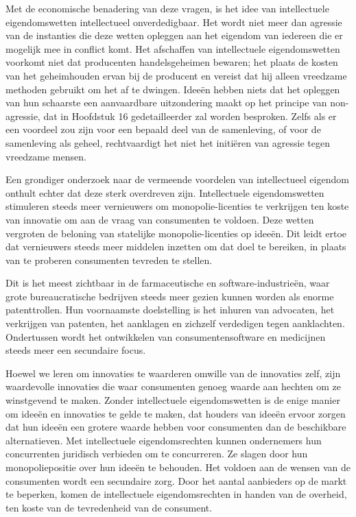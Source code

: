 Met de economische benadering van deze vragen, is het idee van intellectuele eigendomswetten intellectueel onverdedigbaar. Het wordt niet meer dan agressie van de instanties die deze wetten opleggen aan het eigendom van iedereen die er mogelijk mee in conflict komt. Het afschaffen van intellectuele eigendomswetten voorkomt niet dat producenten handelsgeheimen bewaren; het plaats de kosten van het geheimhouden ervan bij de producent en vereist dat hij alleen vreedzame methoden gebruikt om het af te dwingen. Ideeën hebben niets dat het opleggen van hun schaarste een aanvaardbare uitzondering maakt op het principe van non-agressie, dat in Hoofdstuk 16 gedetailleerder zal worden besproken. Zelfs als er een voordeel zou zijn voor een bepaald deel van de samenleving, of voor de samenleving als geheel, rechtvaardigt het niet het initiëren van agressie tegen vreedzame mensen.

Een grondiger onderzoek naar de vermeende voordelen van intellectueel eigendom onthult echter dat deze sterk overdreven zijn. Intellectuele eigendomswetten stimuleren steeds meer vernieuwers om monopolie-licenties te verkrijgen ten koste van innovatie om aan de vraag van consumenten te voldoen. Deze wetten vergroten de beloning van statelijke monopolie-licenties op ideeën. Dit leidt ertoe dat vernieuwers steeds meer middelen inzetten om dat doel te bereiken, in plaats van te proberen consumenten tevreden te stellen.

Dit is het meest zichtbaar in de farmaceutische en software-industrieën, waar grote bureaucratische bedrijven steeds meer gezien kunnen worden als enorme patenttrollen. Hun voornaamste doelstelling is het inhuren van advocaten, het verkrijgen van patenten, het aanklagen en zichzelf verdedigen tegen aanklachten. Ondertussen wordt het ontwikkelen van consumentensoftware en medicijnen steeds meer een secundaire focus.

Hoewel we leren om innovaties te waarderen omwille van de innovaties zelf, zijn waardevolle innovaties die waar consumenten genoeg waarde aan hechten om ze winstgevend te maken. Zonder intellectuele eigendomswetten is de enige manier om ideeën en innovaties te gelde te maken, dat houders van ideeën ervoor zorgen dat hun ideeën een grotere waarde hebben voor consumenten dan de beschikbare alternatieven.
 \autocite{88} Met intellectuele eigendomsrechten kunnen ondernemers hun concurrenten juridisch verbieden om te concurreren. Ze slagen door hun monopoliepositie over hun ideeën te behouden. Het voldoen aan de wensen van de consumenten wordt een secundaire zorg. Door het aantal aanbieders op de markt te beperken, komen de intellectuele eigendomsrechten in handen van de overheid, ten koste van de tevredenheid van de consument.

